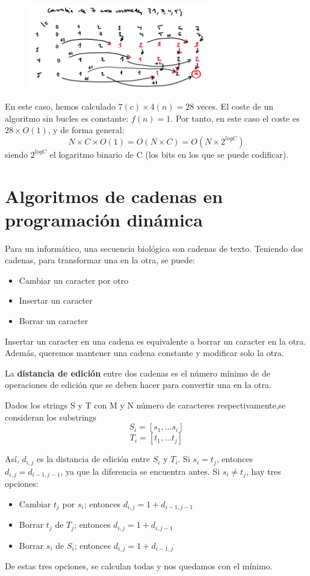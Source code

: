 \begin{figure}[h]
\centering
\includegraphics[width = 0.7\textwidth]{figs/dp-cambio.png}
\end{figure}

En este caso, hemos calculado $7 (c) \times 4 (n) = 28$ veces. El coste de un algoritmo sin bucles es constante: $f(n) = 1$. Por tanto, en este caso el coste es $28 \times O(1)$, y de forma general:
$$N \times C \times O(1) = O(N \times C) = O(N \times 2^{logC})$$
siendo $2^{logC}$ el logaritmo binario de C (los bits en los que se puede codificar).

\section{Algoritmos de cadenas en programación dinámica}
Para un informático, una secuencia biológica son cadenas de texto.
Teniendo dos cadenas, para transformar una en la otra, se puede:
\begin{itemize}
\item Cambiar un caracter por otro
\item Insertar un caracter
\item Borrar un caracter
\end{itemize}
Insertar un caracter en una cadena es equivalente a borrar un caracter en la otra. Además, queremos mantener una cadena constante y modificar solo la otra. 

La \textbf{distancia de edición} entre dos cadenas es el número mínimo de de operaciones de edición que se deben hacer para convertir una en la otra. 

Dados los strings S y T con M y N número de caracteres respectivamente,se consideran los substrings  
$$S_i = [s_1, \ldots s_i]$$
$$T_i = [t_1, \ldots t_j]$$

Así, $d_{i,j}$ es la distancia de edición entre $S_i$ y $T_i$. Si $s_i = t_j$, entonces $d_{i,j} = d_{i-1, j-1}$, ya que la diferencia se encuentra antes. Si $s_i \neq t_j$, hay tres opciones:
\begin{itemize}
\item Cambiar $t_j$ por $s_i$; entonces $d_{i,j} = 1 + d_{i-1, j-1}$
\item Borrar $t_j$ de $T_j$; entonces $d_{i,j} = 1 + d_{i, j-1}$
\item Borrar $s_i$ de $S_i$; entonces $d_{i,j} = 1 + d_{i-1, j}$
\end{itemize}
De estas tres opciones, se calculan todas y nos quedamos con el mínimo.

